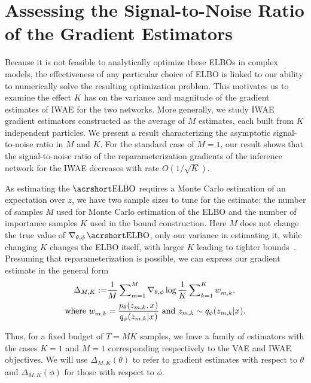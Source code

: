 
\section{Assessing the Signal-to-Noise Ratio of the Gradient Estimators}
\label{sec:snr}
Because it is not feasible to analytically optimize these \glspl{ELBO} in complex models,  the effectiveness of any particular choice of \gls{ELBO} is linked
to our ability to numerically solve the resulting optimization problem. This motivates us to examine 
the effect $K$ has on the variance and magnitude of the gradient estimates of \gls{IWAE} for the two networks. More generally, we study \gls{IWAE} gradient estimators constructed as the average of $M$ estimates, each built from $K$ independent particles. We present a result characterizing the asymptotic signal-to-noise ratio in $M$ and $K$. For the standard case of $M=1$, our result shows that the signal-to-noise ratio of the reparameterization gradients of the inference network for the \gls{IWAE} decreases with rate $O(1/\sqrt{K})$.

As estimating the $\ELBO$ requires a Monte Carlo estimation of an expectation over $z$, 
we have two sample sizes to tune for the estimate:
the number of samples $M$ used for Monte Carlo estimation of the \gls{ELBO} and the number of importance samples $K$ used
in the bound construction.  Here $M$ does not change the true value of
$\nabla_{\theta, \phi} \ELBO$, only our variance in estimating
it, while changing $K$ changes the \gls{ELBO} itself, with larger $K$ leading to tighter 
bounds~\citep{Burda2016importance}.  Presuming that reparameterization
is possible, we can express our gradient estimate in the general form
\begin{align}
\label{eq:grad-est}
\Delta_{M,K} :=  &\frac{1}{M} \sum\nolimits_{m=1}^{M}
\nabla_{\theta, \phi} \log \frac{1}{K} \sum\nolimits_{k=1}^{K} w_{m,k}^{}, \\
\text{where} \, \, w_{m,k}^{} &= \frac{p_{\theta}(z_{m,k},x^{})}{q_{\phi}(z_{m,k} \lvert x^{})} \, \,
\text{and} \, \,z_{m,k} \sim q_{\phi}(z_{m,k} \lvert x^{}). \nonumber
\end{align}

Thus, for a fixed budget of $T = MK$ samples, we have a family of estimators with the cases $K=1$ and $M=1$
corresponding respectively to the \gls{VAE} and \gls{IWAE} objectives.
We will use ${\Delta}_{M,K} \left(\theta\right)$ to refer to gradient estimates with respect
to $\theta$ and ${\Delta}_{M,K} \left(\phi\right)$ for those with respect to
$\phi$. 

